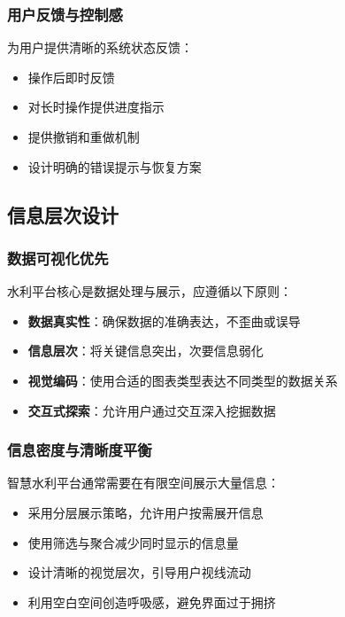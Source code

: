 \subsubsection{用户反馈与控制感}\label{ux7528ux6237ux53cdux9988ux4e0eux63a7ux5236ux611f}

为用户提供清晰的系统状态反馈：

\begin{itemize}
\tightlist
\item
  操作后即时反馈
\item
  对长时操作提供进度指示
\item
  提供撤销和重做机制
\item
  设计明确的错误提示与恢复方案
\end{itemize}

\subsection{信息层次设计}\label{ux4fe1ux606fux5c42ux6b21ux8bbeux8ba1}

\subsubsection{数据可视化优先}\label{ux6570ux636eux53efux89c6ux5316ux4f18ux5148}

水利平台核心是数据处理与展示，应遵循以下原则：

\begin{itemize}
\tightlist
\item
  \textbf{数据真实性}：确保数据的准确表达，不歪曲或误导
\item
  \textbf{信息层次}：将关键信息突出，次要信息弱化
\item
  \textbf{视觉编码}：使用合适的图表类型表达不同类型的数据关系
\item
  \textbf{交互式探索}：允许用户通过交互深入挖掘数据
\end{itemize}

\subsubsection{信息密度与清晰度平衡}\label{ux4fe1ux606fux5bc6ux5ea6ux4e0eux6e05ux6670ux5ea6ux5e73ux8861}

智慧水利平台通常需要在有限空间展示大量信息：

\begin{itemize}
\tightlist
\item
  采用分层展示策略，允许用户按需展开信息
\item
  使用筛选与聚合减少同时显示的信息量
\item
  设计清晰的视觉层次，引导用户视线流动
\item
  利用空白空间创造呼吸感，避免界面过于拥挤
\end{itemize}

